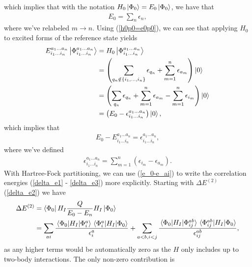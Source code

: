 \documentclass[Dual]{msu-thesis}
\begin{document}
which implies that with the notation $H_0\ket{\Phi_0}=E_0\ket{\Phi_0}$, we have that
\begin{align}
E_0 = \sum_n\epsilon_n,
\end{align}
where we've relabeled $m\to n$. Using (\ref{h0p0=e0p0}), we can see that applying $H_0$ to excited forms of the reference state yields
\begin{align}
E^{a_1\ldots a_n}_{i_1\ldots i_n}\ket{\Phi^{a_1\ldots a_n}_{i_1\ldots i_n}}
&=
H_0\ket{\Phi^{a_1\ldots a_n}_{i_1\ldots i_n}}
\\
&=
\left(
\sum_{q_n\notin\{i_1,\ldots,i_n\}}\epsilon_{q_n}
+
\sum_{m=1}^n\epsilon_{a_m}
\right)
\ket{0}
\\
&=
\left(
\sum_{q_n}\epsilon_{q_n}
+
\sum_{m=1}^n\epsilon_{a_m}
-
\sum_{m=1}^n\epsilon_{i_m}
\right)
\ket{0}
\\
&=
\left(E_0-\epsilon^{a_1\ldots a_n}_{i_1\ldots i_n}\right)\ket{0},
\end{align}
which implies that
\begin{align}
\label{e_0-e_ai}
E_0-E^{a_1\ldots a_n}_{i_1\ldots i_n}=\epsilon^{a_1\ldots a_n}_{i_1\ldots i_n},
\end{align}
where we've defined
\begin{align}
\epsilon^{a_1\ldots a_n}_{i_1\ldots i_n}
=
\sum_{m=1}^n
\left(
\epsilon_{i_m}
-
\epsilon_{a_m}
\right).
\end{align}
With Hartree-Fock partitioning, we can use (\ref{e_0-e_ai}) to write the correlation energies (\ref{delta_e1} - \ref{delta_e3}) more explicitly. Starting with $\Delta E^{(2)}$ (\ref{delta_e2}) we have
\begin{align}
\Delta E^{(2)}
&=
\bra{\Phi_0}H_I\frac{Q}{E_0-E_n}H_I\ket{\Phi_0}
\\
&=
\sum_{ai}\frac{\mel*{\Phi_0}{H_I}{\Phi^{a}_{i}}\mel*{\Phi^{a}_{i}}{H_I}{\Phi_0}}{\epsilon^{a}_{i}}
+
\sum_{a<b,i<j}\frac{\mel*{\Phi_0}{H_I}{\Phi^{ab}_{ij}}\mel*{\Phi^{ab}_{ij}}{H_I}{\Phi_0}}{\epsilon^{ab}_{ij}},
\end{align}
as any higher terms would be automatically zero as the $H$ only includes up to two-body interactions. The only non-zero contribution is
\end{document}
